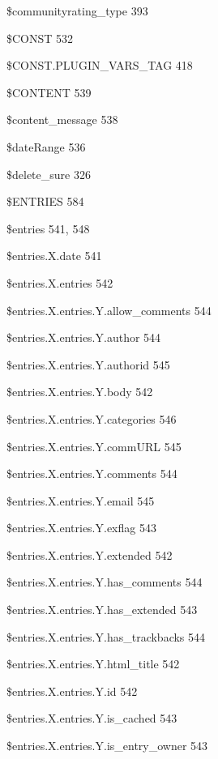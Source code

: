 \documentclass{book}
\renewcommand\subitem{\par}
\begin{document}
\begin{multicols}{2}
\begin{osp-index}
    \subitem \$communityrating\_type\hspace{1mm} 393
    \subitem \$CONST\hspace{1mm} 532
    \subitem \$CONST.PLUGIN\_VARS\_TAG\hspace{1mm} 418
    \subitem \$CONTENT\hspace{1mm} 539
    \subitem \$content\_message\hspace{1mm} 538
    \subitem \$dateRange\hspace{1mm} 536
    \subitem \$delete\_sure\hspace{1mm} 326
    \subitem \$ENTRIES\hspace{1mm} 584
    \subitem \$entries\hspace{1mm} 541, 548
    \subitem \$entries.X.date\hspace{1mm} 541
    \subitem \$entries.X.entries\hspace{1mm} 542
    \subitem \$entries.X.entries.Y.allow\_comments\hspace{1mm} 544
    \subitem \$entries.X.entries.Y.author\hspace{1mm} 544
    \subitem \$entries.X.entries.Y.authorid\hspace{1mm} 545
    \subitem \$entries.X.entries.Y.body\hspace{1mm} 542
    \subitem \$entries.X.entries.Y.categories\hspace{1mm} 546
    \subitem \$entries.X.entries.Y.commURL\hspace{1mm} 545
    \subitem \$entries.X.entries.Y.comments\hspace{1mm} 544
    \subitem \$entries.X.entries.Y.email\hspace{1mm} 545
    \subitem \$entries.X.entries.Y.exflag\hspace{1mm} 543
    \subitem \$entries.X.entries.Y.extended\hspace{1mm} 542
    \subitem \$entries.X.entries.Y.has\_comments\hspace{1mm} 544
    \subitem \$entries.X.entries.Y.has\_extended\hspace{1mm} 543
    \subitem \$entries.X.entries.Y.has\_trackbacks\hspace{1mm} 544
    \subitem \$entries.X.entries.Y.html\_title\hspace{1mm} 542
    \subitem \$entries.X.entries.Y.id\hspace{1mm} 542
    \subitem \$entries.X.entries.Y.is\_cached\hspace{1mm} 543
    \subitem \$entries.X.entries.Y.is\_entry\_owner\hspace{1mm} 543

\end{osp-index}
\end{multicols}
\end{document}
